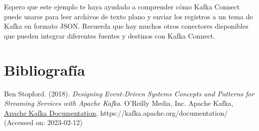 \documentclass{article}
\begin{document}
Espero que este ejemplo te haya ayudado a comprender cómo Kafka Connect puede usarse para leer archivos de texto plano y enviar los registros a un tema de Kafka en formato JSON. Recuerda que hay muchos otros conectores disponibles que pueden integrar diferentes fuentes y destinos con Kafka Connect.











\newpage
\section{Bibliografía}
\begin{thebibliography}{9}
Ben Stopford. (2018). \textit{Designing Event-Driven Systems
Concepts and Patterns for Streaming
Services with Apache Kafka}. O'Reilly Media, Inc.
 Apache Kafka, 
\href{https://kafka.apache.org/documentation/}{Apache Kafka Documentation}, https://kafka.apache.org/documentation/ (Accessed on: 2023-02-12)
\end{thebibliography}
\end{document}
